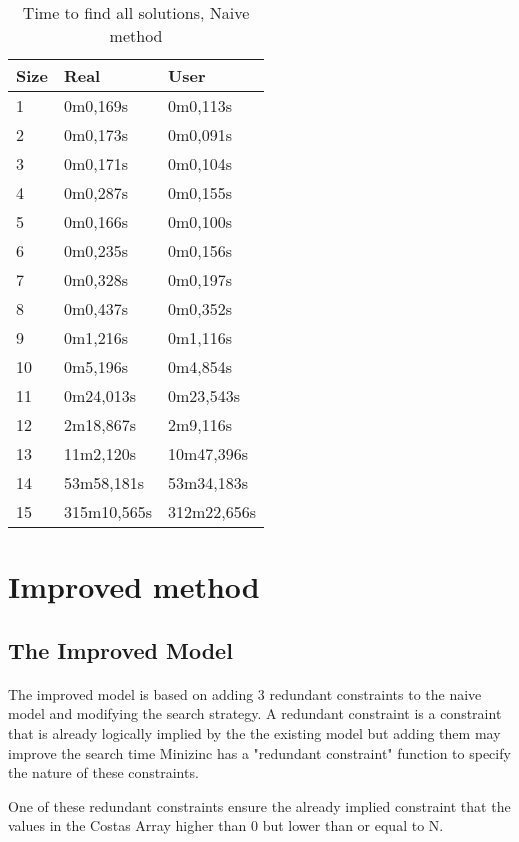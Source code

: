\documentclass[runningheads]{llncs}
\begin{document}
\begin{table}[H]
\centering
\caption{Time to find all solutions, Naive method}\label{NAVA}
\begin{tabular}{|l|l|l|}
\hline
Size & Real & User\\
\hline
1 & 0m0,169s & 0m0,113s\\
2 & 0m0,173s & 0m0,091s\\
3 & 0m0,171s & 0m0,104s\\
4 & 0m0,287s & 0m0,155s\\
5 & 0m0,166s & 0m0,100s\\
6 & 0m0,235s & 0m0,156s\\
7 & 0m0,328s & 0m0,197s\\
8 & 0m0,437s & 0m0,352s\\
9 & 0m1,216s & 0m1,116s\\
10 & 0m5,196s & 0m4,854s\\
11 & 0m24,013s & 0m23,543s\\
12 & 2m18,867s & 2m9,116s\\
13 & 11m2,120s & 10m47,396s\\
14 & 53m58,181s & 53m34,183s\\
15 & 315m10,565s & 312m22,656s\\
\hline
\end{tabular}
\end{table}

\section{Improved method}
\subsection{The Improved Model}
\paragraph{}

The improved model is based on adding 3 redundant constraints to the naive model and modifying the search strategy.
A redundant constraint is a constraint that is already logically implied by the the existing model but adding them may improve the search time
Minizinc has a "redundant constraint" function to specify the nature of these constraints.

One of these redundant constraints ensure the already implied constraint that the values in the Costas Array higher than 0 but lower than or equal to N.
\end{document}
